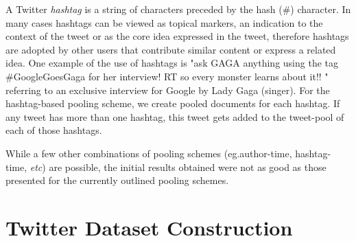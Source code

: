 \documentclass{sig-alternate}
\newcommand{\secmoveup}{\vspace{-1.mm}}
\begin{document}
\vspace{1mm} A Twitter \textit{hashtag} is a
string of characters preceded by the hash (\#) character. In many
cases hashtags can be viewed as topical markers, an indication to the
context of the tweet or as the core idea expressed in the tweet,
therefore hashtags are adopted by other users that contribute similar
content or express a related idea. One example of the use of hashtags
is "ask GAGA anything using the tag \#GoogleGoesGaga for her
interview! RT so every monster learns about it!! " referring to an
exclusive interview for Google by Lady Gaga (singer).
For the hashtag-based pooling scheme, we create pooled documents
for each hashtag. If any tweet has more than one hashtag, this tweet
gets added to the tweet-pool of each of those hashtags.

\vspace{1mm} While a few other combinations of
pooling schemes (eg.author-time, hashtag-time, \textit{etc}) are
possible, the initial results obtained were not as good as those
presented for the currently outlined pooling schemes.  


\secmoveup
\section{Twitter Dataset Construction}

\label{sec:dataset}

\end{document}
